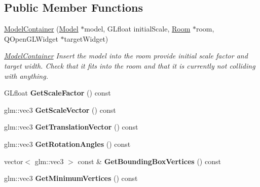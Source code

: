 \subsection*{Public Member Functions}
\begin{DoxyCompactItemize}
\item 
\hyperlink{class_model_container_a5145271e175fb5434c5209d170a2749d}{Model\+Container} (\hyperlink{class_model}{Model} $\ast$model, G\+Lfloat initial\+Scale, \hyperlink{class_room}{Room} $\ast$room, Q\+Open\+G\+L\+Widget $\ast$target\+Widget)
\begin{DoxyCompactList}\small\item\em \hyperlink{class_model_container}{Model\+Container} Insert the model into the room provide initial scale factor and target width. Check that it fits into the room and that it is currently not colliding with anything. \end{DoxyCompactList}\item 
\hypertarget{class_model_container_ad403022f0e44b40ae6576b1c9454263e}{}G\+Lfloat {\bfseries Get\+Scale\+Factor} () const \label{class_model_container_ad403022f0e44b40ae6576b1c9454263e}

\item 
\hypertarget{class_model_container_ae859dd4743c5c4dcd3ed4044dfe60ffe}{}glm\+::vec3 {\bfseries Get\+Scale\+Vector} () const \label{class_model_container_ae859dd4743c5c4dcd3ed4044dfe60ffe}

\item 
\hypertarget{class_model_container_ad76f4a36da8b3696089f2843382cf9fb}{}glm\+::vec3 {\bfseries Get\+Translation\+Vector} () const \label{class_model_container_ad76f4a36da8b3696089f2843382cf9fb}

\item 
\hypertarget{class_model_container_a1346377aa22a8e763475cc868e7b085c}{}glm\+::vec3 {\bfseries Get\+Rotation\+Angles} () const \label{class_model_container_a1346377aa22a8e763475cc868e7b085c}

\item 
\hypertarget{class_model_container_a14d2a1daa39d7f051a0022b577b8759e}{}vector$<$ glm\+::vec3 $>$ const \& {\bfseries Get\+Bounding\+Box\+Vertices} () const \label{class_model_container_a14d2a1daa39d7f051a0022b577b8759e}

\item 
\hypertarget{class_model_container_a5d5e757812e3c6d26b7217618f52680d}{}glm\+::vec3 {\bfseries Get\+Minimum\+Vertices} () const \label{class_model_container_a5d5e757812e3c6d26b7217618f52680d}


\end{DoxyCompactItemize}

